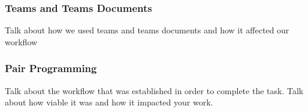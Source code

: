 \documentclass[11pt]{article}
\begin{document}
\subsubsection{Teams and Teams Documents}
Talk about how we used teams and teams documents and how it affected our workflow

\subsubsection{Pair Programming}
Talk about the workflow that was established in order to complete the task. Talk about how viable it was and how it impacted your work.





\end{document}
